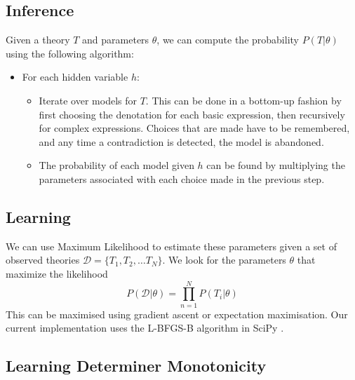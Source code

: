 \documentclass{svmult}
\begin{document}
\subsection{Inference}

Given a theory $T$ and parameters $\theta$, we can compute the
probability $P(T|\theta)$ using the following algorithm:
\begin{itemize}
\item For each hidden variable $h$:
\begin{itemize}
\item Iterate over models for $T$. This can be done in a bottom-up
  fashion by first choosing the denotation for each basic expression,
  then recursively for complex expressions. Choices that are made have
  to be remembered, and any time a contradiction is detected, the
  model is abandoned.
\item The probability of each model given $h$ can be found by
  multiplying the parameters associated with each choice made in the
  previous step.
\end{itemize}
\end{itemize}

\subsection{Learning}

We can use Maximum Likelihood to estimate these parameters given a set
of observed theories $\mathcal{D} = \{T_1, T_2, \ldots T_N\}$. We look
for the parameters $\theta$ that maximize the likelihood
$$P(\mathcal{D}|\theta) = \prod_{n=1}^N P(T_i|\theta)$$
This can be maximised using gradient ascent or expectation
maximisation. Our current implementation uses the L-BFGS-B algorithm
in SciPy \cite{Zhu:97}.

\subsection{Learning Determiner Monotonicity}
\end{document}
